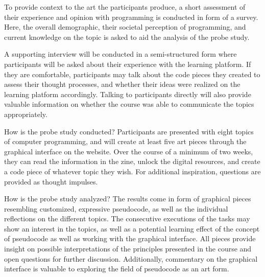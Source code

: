 To provide context to the art the participants produce, a short assessment of their experience and opinion with programming is conducted in form of a survey. Here, the overall demographic, their societal perception of programming, and current knowledge on the topic is asked to aid the analysis of the probe study.

A supporting interview will be conducted in a semi-structured form where participants will be asked about their experience with the learning platform. If they are comfortable, participants may talk about the code pieces they created to assess their thought processes, and whether their ideas were realized on the learning platform accordingly. Talking to participants directly will also provide valuable information on whether the course was able to communicate the topics appropriately. 

How is the probe study conducted?
Participants are presented with eight topics of computer programming, and will create at least five art pieces through the graphical interface on the website. Over the course of a minimum of two weeks, they can read the information in the zine, unlock the digital resources, and create a code piece of whatever topic they wish. For additional inspiration, questions are provided as thought impulses.

How is the probe study analyzed?
The results come in form of graphical pieces resembling customized, expressive pseudocode, as well as the individual reflections on the different topics. The consecutive executions of the tasks may show an interest in the topics, as well as a potential learning effect of the concept of pseudocode as well as working with the graphical interface. All pieces provide insight on possible interpretations of the principles presented in the course and open questions for further discussion. Additionally, commentary on the graphical interface is valuable to exploring the field of pseudocode as an art form.

